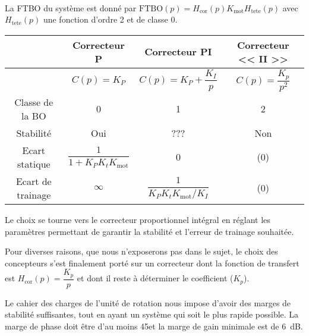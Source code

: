 \ifprof
\begin{corrige} ~\\

La FTBO du système est donné par $\text{FTBO}(p)=H_{\text{cor}}(p)K_{\text{mot}}H_{\text{tete}}(p)$ avec 
$H_{\text{tete}}(p)$ une fonction d'ordre 2 et de classe 0. 

\begin{center}
\begin{tabular}{cccc}
\hline
& Correcteur P & Correcteur PI & Correcteur << II >> \\\hline
& $C(p)=K_P$    & $C(p)=K_P + \dfrac{K_I}{p}$ & $C(p)= \dfrac{K_p}{p^2}$  \\  \hline
Classe de la BO & 0 & 1 & 2 \\\hline
Stabilité  & Oui & ??? & Non \\\hline
Ecart statique & $\dfrac{1}{1+K_PK_tK_{\text{mot}}}$ & 0 & (0)\\\hline
Ecart de trainage & $\infty$ & $\dfrac{1}{K_PK_tK_{\text{mot}}/K_I}$ & (0)\\\hline
\end{tabular}
\end{center}
Le choix se tourne vers le correcteur proportionnel intégral en réglant les paramètres permettant de garantir la stabilité et l'erreur de trainage souhaitée. 
\end{corrige}
\else
\fi


Pour diverses raisons, que nous n’exposerons pas dans le sujet, le choix des concepteurs s’est finalement
porté sur un correcteur dont la fonction de transfert est 
$H_{\text{cor}}(p) = \dfrac{K_p}{p}$ et dont il reste à déterminer le
coefficient ($K_p$).


Le cahier des charges de l’unité de rotation nous impose d’avoir des marges de stabilité suffisantes, tout en
ayant un système qui soit le plus rapide possible. La marge de phase doit être d’au moins 45\degres et la marge
de gain minimale est de \SI{6}{dB}.

